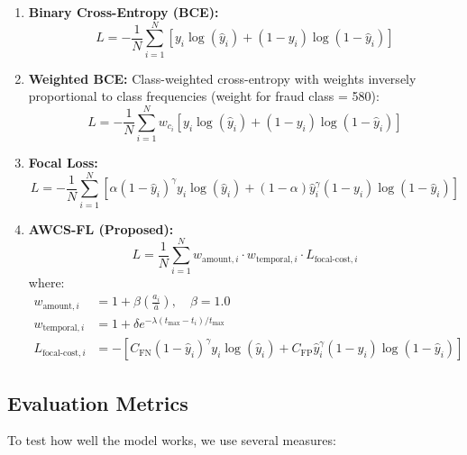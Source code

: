 \documentclass[10pt,twocolumn,letterpaper]{article}
\begin{document}
\begin{enumerate}
  \item \textbf{Binary Cross-Entropy (BCE):}
  \begin{equation}
    L = -\frac{1}{N}\sum_{i=1}^{N} \left[ y_i \log(\hat{y}_i) + (1-y_i) \log(1-\hat{y}_i) \right]
  \end{equation}

  \item \textbf{Weighted BCE:} Class-weighted cross-entropy with weights inversely proportional to class frequencies (weight for fraud class = 580):
  \begin{equation}
    L = -\frac{1}{N}\sum_{i=1}^{N} w_{c_i} \left[ y_i \log(\hat{y}_i) + (1-y_i) \log(1-\hat{y}_i) \right]
  \end{equation}

  \item \textbf{Focal Loss:}
  \begin{equation}
    L = -\frac{1}{N}\sum_{i=1}^{N} \left[ \alpha(1-\hat{y}_i)^{\gamma} y_i \log(\hat{y}_i) + (1-\alpha)\hat{y}_i^{\gamma}(1-y_i)\log(1-\hat{y}_i) \right]
  \end{equation}

  \item \textbf{AWCS-FL (Proposed):}
  \begin{equation}
    L = \frac{1}{N}\sum_{i=1}^{N} w_{\text{amount},i} \cdot w_{\text{temporal},i} \cdot L_{\text{focal-cost},i}
  \end{equation}
  where:
  \begin{align}
    w_{\text{amount},i} &= 1 + \beta\left(\frac{a_i}{\bar{a}}\right), \quad \beta = 1.0 \\
    w_{\text{temporal},i} &= 1 + \delta e^{-\lambda(t_{\max} - t_i) / t_{\max}} \\
    L_{\text{focal-cost},i} &= -\left[ C_{\text{FN}}(1-\hat{y}_i)^{\gamma} y_i \log(\hat{y}_i) + C_{\text{FP}}\hat{y}_i^{\gamma}(1-y_i)\log(1-\hat{y}_i) \right]
  \end{align}

\end{enumerate}

\subsection{Evaluation Metrics}

To test how well the model works, we use several measures:
\end{document}
